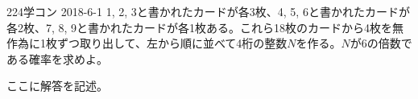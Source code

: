 \begin{thm}{224}{\maru}{学コン 2018-6-1}
 1, 2, 3と書かれたカードが各3枚、4, 5, 6と書かれたカードが各2枚、7, 8, 9と書かれたカードが各1枚ある。これら18枚のカードから4枚を無作為に1枚ずつ取り出して、左から順に並べて4桁の整数$N$を作る。$N$が6の倍数である確率を求めよ。
\end{thm}

ここに解答を記述。